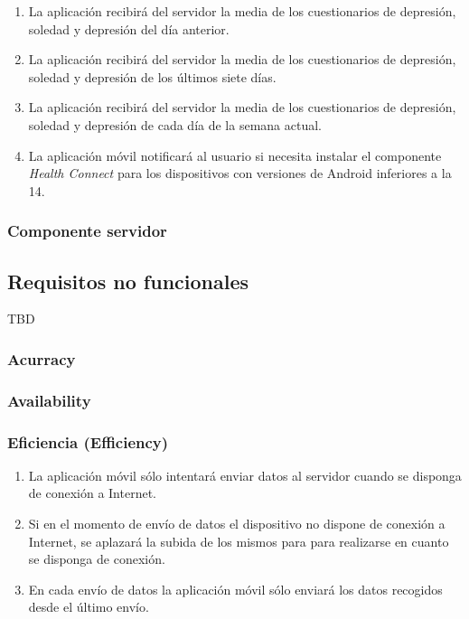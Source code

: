 \begin{enumerate}[label=\textbf{\texttt{RF-\arabic*}}]
            \item La aplicación recibirá del servidor la media de los cuestionarios de depresión, soledad y depresión del día anterior.
            \item La aplicación recibirá del servidor la media de los cuestionarios de depresión, soledad y depresión de los últimos siete días.
            \item La aplicación recibirá del servidor la media de los cuestionarios de depresión, soledad y depresión de cada día de la semana actual. 

            \item La aplicación móvil notificará al usuario si necesita instalar el componente \textit{Health Connect} para los dispositivos con versiones de Android inferiores a la 14.

        \end{enumerate}

        \subsubsection{Componente servidor}
    
    \subsection{Requisitos no funcionales}
        TBD
        \subsubsection{Acurracy}
        \subsubsection{Availability}
        \subsubsection{Eficiencia (Efficiency)}
            \begin{enumerate}[label=\textbf{\texttt{RNF-\arabic*}}]
                \item La aplicación móvil sólo intentará enviar datos al servidor cuando se disponga de conexión a Internet.
                \item Si en el momento de envío de datos el dispositivo no dispone de conexión a Internet, se aplazará la subida de los mismos para para realizarse en cuanto se disponga de conexión.
                \item En cada envío de datos la aplicación móvil sólo enviará los datos recogidos desde el último envío.
            \end{enumerate}

